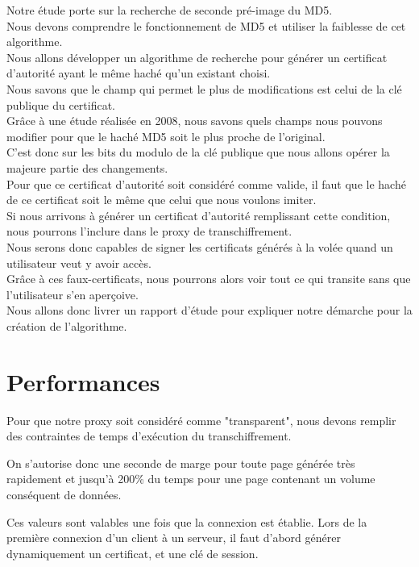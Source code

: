 \documentclass[a4paper,11pt,french]{article}
\begin{document}
Notre étude porte sur la recherche de seconde pré-image du MD5.\\
Nous devons comprendre le fonctionnement de MD5 et utiliser la faiblesse de cet algorithme.\\
Nous allons développer un algorithme de recherche pour générer un certificat d'autorité ayant le même haché qu'un existant choisi.\\
Nous savons que le champ qui permet le plus de modifications est celui de la clé publique du certificat.\\
Grâce à une étude réalisée en 2008, nous savons quels champs nous pouvons modifier pour que le haché MD5 soit le plus proche de l'original.\\
C'est donc sur les bits du modulo de la clé publique que nous allons opérer la majeure partie des changements.\\
Pour que ce certificat d'autorité soit considéré comme valide, il faut que le haché de ce certificat soit le même que celui que nous voulons imiter.\\
Si nous arrivons à générer un certificat d'autorité remplissant cette condition, nous pourrons l'inclure dans le proxy de transchiffrement.\\
Nous serons donc capables de signer les certificats générés à la volée quand un utilisateur veut y avoir accès.\\
Grâce à ces faux-certificats, nous pourrons alors voir tout ce qui transite sans que l'utilisateur s'en aperçoive.\\
Nous allons donc livrer un rapport d'étude pour expliquer notre démarche pour la création de l'algorithme.\\



\section{Performances}
Pour que notre proxy soit considéré comme "transparent", nous devons remplir des contraintes de temps d'exécution du transchiffrement.

On s'autorise donc une seconde de marge pour toute page générée très rapidement et jusqu'à 200\% du temps pour une page contenant un volume conséquent de données.

Ces valeurs sont valables une fois que la connexion est établie. Lors de la première connexion d'un client à un serveur, il faut d'abord générer dynamiquement un certificat, et une clé de session.
\end{document}

